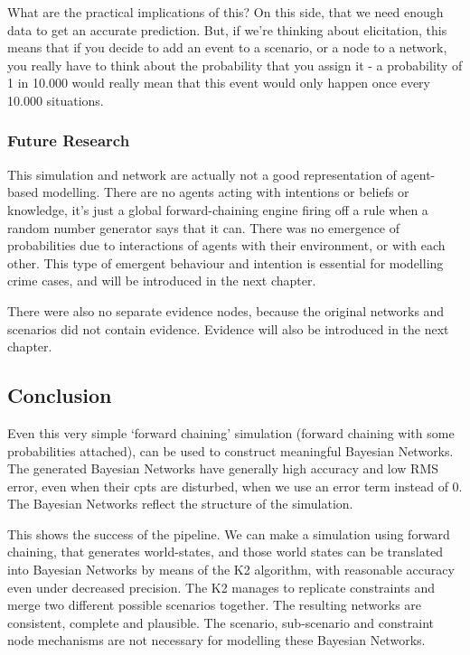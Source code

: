 What are the practical implications of this? On this side, that we need enough data to get an accurate prediction. But, if we're thinking about elicitation, this means that if you decide to add an event to a scenario, or a node to a network, you really have to think about the probability that you assign it - a probability of 1 in 10.000 would really mean that this event would only happen once every 10.000 situations.

\subsubsection{Future Research}
This simulation and network are actually not a good representation of agent-based modelling. There are no agents acting with intentions or beliefs or knowledge, it's just a global forward-chaining engine firing off a rule when a random number generator says that it can. There was no emergence of probabilities due to interactions of agents with their environment, or with each other. This type of emergent behaviour and intention is essential for modelling crime cases, and will be introduced in the next chapter.

There were also no separate evidence nodes, because the original networks and scenarios did not contain evidence. Evidence will also be introduced in the next chapter.



\subsection{Conclusion}
Even this very simple `forward chaining' simulation (forward chaining with some probabilities attached), can be used to construct meaningful Bayesian Networks. The generated Bayesian Networks have generally high accuracy and low RMS error, even when their cpts are disturbed,  when we use an error term instead of 0. The Bayesian Networks reflect the structure of the simulation. 

This shows the success of the pipeline. We can make a simulation using forward chaining, that generates world-states, and those world states can be translated into Bayesian Networks by means of the K2 algorithm, with reasonable accuracy even under decreased precision. The K2 manages to replicate constraints and merge two different possible scenarios together. The resulting networks are consistent, complete and plausible. The scenario, sub-scenario and constraint node mechanisms are not necessary for modelling these Bayesian Networks.

